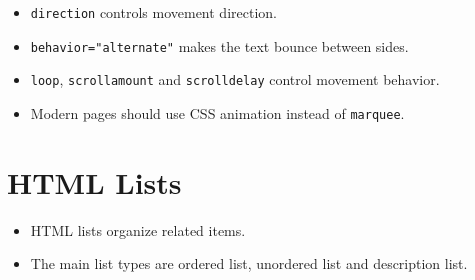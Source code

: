 \begin{itemize}
    \item \texttt{direction} controls movement direction.
    \item \texttt{behavior="alternate"} makes the text bounce between sides.
    \item \texttt{loop}, \texttt{scrollamount} and \texttt{scrolldelay} control movement behavior.
    \item Modern pages should use CSS animation instead of \texttt{marquee}.
\end{itemize}

\section{HTML Lists}
\begin{itemize}
    \item HTML lists organize related items.
    \item The main list types are ordered list, unordered list and description list.
\end{itemize}


